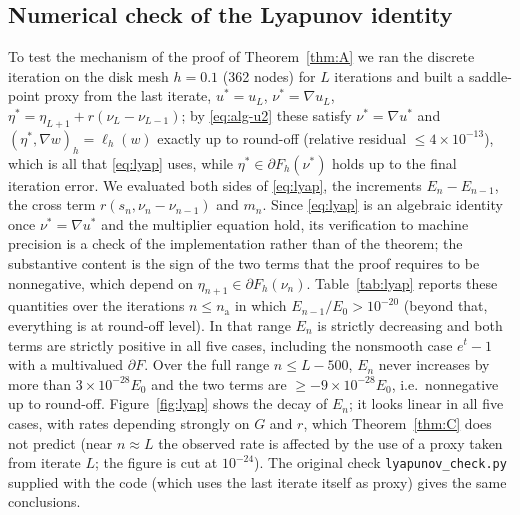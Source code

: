 \documentclass[11pt]{amsart}
\theoremstyle{definition}
\theoremstyle{remark}
\numberwithin{equation}{section}
\begin{document}
\subsection{Numerical check of the Lyapunov identity}\label{ssec:lyap-num}
To test the mechanism of the proof of Theorem~\ref{thm:A} we ran the discrete iteration on the disk mesh $h=0.1$ (362 nodes) for $L$ iterations and built a saddle-point proxy from the last iterate, $u^*=u_L$, $\nu^*=\nabla u_L$, $\eta^*=\eta_{L+1}+r(\nu_L-\nu_{L-1})$; by \eqref{eq:alg-u2} these satisfy $\nu^*=\nabla u^*$ and $(\eta^*,\nabla w)_h=\ell_h(w)$ exactly up to round-off (relative residual $\le4\times10^{-13}$), which is all that \eqref{eq:lyap} uses, while $\eta^*\in\partial F_h(\nu^*)$ holds up to the final iteration error. We evaluated both sides of \eqref{eq:lyap}, the increments $E_n-E_{n-1}$, the cross term $r(s_n,\nu_n-\nu_{n-1})$ and $m_n$. Since \eqref{eq:lyap} is an algebraic identity once $\nu^*=\nabla u^*$ and the multiplier equation hold, its verification to machine precision is a check of the implementation rather than of the theorem; the substantive content is the sign of the two terms that the proof requires to be nonnegative, which depend on $\eta_{n+1}\in\partial F_h(\nu_n)$. Table~\ref{tab:lyap} reports these quantities over the iterations $n\le n_{\mathrm{a}}$ in which $E_{n-1}/E_0>10^{-20}$ (beyond that, everything is at round-off level). In that range $E_n$ is strictly decreasing and both terms are strictly positive in all five cases, including the nonsmooth case $e^t-1$ with a multivalued $\partial F$. Over the full range $n\le L-500$, $E_n$ never increases by more than $3\times10^{-28}E_0$ and the two terms are $\ge-9\times10^{-28}E_0$, i.e.\ nonnegative up to round-off. Figure~\ref{fig:lyap} shows the decay of $E_n$; it looks linear in all five cases, with rates depending strongly on $G$ and $r$, which Theorem~\ref{thm:C} does not predict (near $n\approx L$ the observed rate is affected by the use of a proxy taken from iterate $L$; the figure is cut at $10^{-24}$). The original check \texttt{lyapunov\_check.py} supplied with the code (which uses the last iterate itself as proxy) gives the same conclusions.
\end{document}
